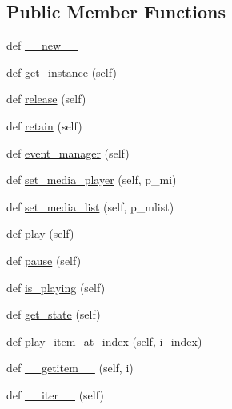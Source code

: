 \subsection*{Public Member Functions}
\begin{DoxyCompactItemize}
\item 
def \hyperlink{classsrc_1_1lib_1_1vlc_1_1MediaListPlayer_a6a00ba884fbd12bd50e925900ac9afdd}{\+\_\+\+\_\+new\+\_\+\+\_\+}
\item 
def \hyperlink{classsrc_1_1lib_1_1vlc_1_1MediaListPlayer_a7cba140bab9b134c069e6c643ea6e4b8}{get\+\_\+instance} (self)
\item 
def \hyperlink{classsrc_1_1lib_1_1vlc_1_1MediaListPlayer_ae091f90b3e798db3d39f56a05036a8c4}{release} (self)
\item 
def \hyperlink{classsrc_1_1lib_1_1vlc_1_1MediaListPlayer_a9a6aad5a53000b64e727e3d0979d775e}{retain} (self)
\item 
def \hyperlink{classsrc_1_1lib_1_1vlc_1_1MediaListPlayer_a6825e34f893a0408d8bf64b268badcad}{event\+\_\+manager} (self)
\item 
def \hyperlink{classsrc_1_1lib_1_1vlc_1_1MediaListPlayer_a0e79bb23a5b9f95e8bc087a645f105a2}{set\+\_\+media\+\_\+player} (self, p\+\_\+mi)
\item 
def \hyperlink{classsrc_1_1lib_1_1vlc_1_1MediaListPlayer_a1cfc33bae19366938758bcdbc2fb9aa4}{set\+\_\+media\+\_\+list} (self, p\+\_\+mlist)
\item 
def \hyperlink{classsrc_1_1lib_1_1vlc_1_1MediaListPlayer_a7a0586b4921dd11d98afe4ae955ca1dd}{play} (self)
\item 
def \hyperlink{classsrc_1_1lib_1_1vlc_1_1MediaListPlayer_ab55560ffca721b03629f4607e0d69bbc}{pause} (self)
\item 
def \hyperlink{classsrc_1_1lib_1_1vlc_1_1MediaListPlayer_a7de79f0992d43dc68107ff4667048cd2}{is\+\_\+playing} (self)
\item 
def \hyperlink{classsrc_1_1lib_1_1vlc_1_1MediaListPlayer_adfc9fdb1f5e72a681eb6fa7c28544543}{get\+\_\+state} (self)
\item 
def \hyperlink{classsrc_1_1lib_1_1vlc_1_1MediaListPlayer_abfbdf506fb948a060712692f5ac3edae}{play\+\_\+item\+\_\+at\+\_\+index} (self, i\+\_\+index)
\item 
def \hyperlink{classsrc_1_1lib_1_1vlc_1_1MediaListPlayer_a0dd0daddbae8badbdbafbdbc1587b1f8}{\+\_\+\+\_\+getitem\+\_\+\+\_\+} (self, i)
\item 
def \hyperlink{classsrc_1_1lib_1_1vlc_1_1MediaListPlayer_aad30dcdd7cb8147b4033bdff3ab1fbad}{\+\_\+\+\_\+iter\+\_\+\+\_\+} (self)

\end{DoxyCompactItemize}
